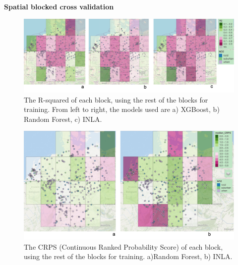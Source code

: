 \documentclass{article}
\begin{document}
\textbf{Spatial blocked cross validation }

\begin{figure}
    \centering
    \includegraphics[scale=0.4]{fig/r2spcv.png}
    \caption{The R-squared of each block, using the rest of the blocks for training. From left to right, the models used are a) XGBoost, b) Random Forest, c) INLA. 
}
    \label{fig:r2}
\end{figure}

\begin{figure}
    \centering
    \includegraphics[scale=0.3]{fig/crps_RF_INLA.png}
    \caption{The CRPS (Continuous Ranked Probability Score) of each block, using the rest of the blocks for training. a)Random Forest, b) INLA. 
}
    \label{fig:r2}
\end{figure}
\end{document}
